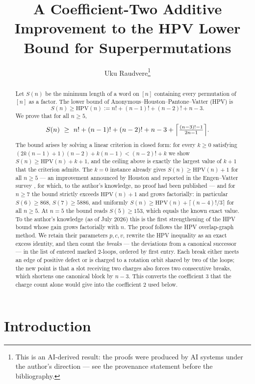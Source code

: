 \documentclass[11pt]{article}
\title{A Coefficient-Two Additive Improvement to the HPV Lower Bound for Superpermutations}
\author{Uku Raudvere\thanks{This is an AI-derived result: the proofs were produced by AI
systems under the author's direction --- see the provenance statement before the
bibliography.}}
\date{}
\newcommand{\HPV}{\mathrm{HPV}}
\begin{document}
\maketitle

\begin{abstract}
Let \(S(n)\) be the minimum length of a word on \([n]\) containing every permutation of \([n]\) as a
factor.  The lower bound of Anonymous--Houston--Pantone--Vatter (HPV) is
\[
  S(n)\ge \HPV(n):=n!+(n-1)!+(n-2)!+n-3.
\]
We prove that for all \(n\ge 5\),
\[
  S(n)\ \ge\ n!+(n-1)!+(n-2)!+n-3+\Bigl\lceil\tfrac{(n-3)!-1}{2n-1}\Bigr\rceil .
\]
The bound arises by solving a linear criterion in closed form: for every \(k\ge 0\) satisfying
\((2k(n-1)+1)(n-2)+k(n-1)<(n-2)!+k\) we show \(S(n)\ge\HPV(n)+k+1\), and the ceiling above is
exactly the largest value of \(k+1\) that the criterion admits.  The \(k=0\) instance already
gives \(S(n)\ge\HPV(n)+1\) for all \(n\ge5\) --- an improvement announced by Houston and
reported in the Engen--Vatter survey \cite{EV}, for which, to the author's knowledge, no
proof had been published --- and
for \(n\ge7\) the bound strictly exceeds \(\HPV(n)+1\) and grows factorially: in particular
\(S(6)\ge 868\), \(S(7)\ge 5886\), and uniformly \(S(n)\ge\HPV(n)+\lceil(n-4)!/3\rceil\)
for all \(n\ge5\).  At
\(n=5\) the bound reads \(S(5)\ge 153\), which equals the known exact value.  To the author's
knowledge (as of July 2026) this is the first strengthening of the HPV bound whose gain grows
factorially with \(n\).
The proof follows the HPV overlap-graph method.  We retain their parameters \(p,c,v\), rewrite the
HPV inequality as an exact excess identity, and then count the \emph{breaks} --- the deviations
from a canonical successor --- in the list of entered marked \(2\)-loops, ordered by first entry.
Each break either meets an edge of positive defect or is charged to a rotation orbit shared by
two of the loops; the new point is that a slot receiving two charges also forces two consecutive
breaks, which shortens one canonical block by \(n-3\).  This converts the
coefficient \(3\) that the charge count alone would give into the coefficient \(2\) used below.
\end{abstract}

\section{Introduction}
\end{document}
